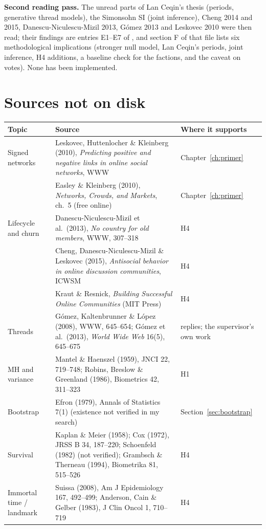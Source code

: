 \textbf{Second reading pass.} The unread parts of Lan Ceqin's thesis (periods, generative thread models), the Simonsohn SI (joint inference), Cheng 2014 and 2015, Danescu-Niculescu-Mizil 2013, G\'omez 2013 and Leskovec 2010 were then read; their findings are entries E1--E7 of , and section F of that file lists six methodological implications (stronger null model, Lan Ceqin's periods, joint inference, H4 additions, a baseline check for the factions, and the caveat on votes). None has been implemented.

\section{Sources not on disk}
\begin{tabularx}{\textwidth}{@{}l Y l@{}}
\toprule
Topic & Source & Where it supports \\
\midrule
Signed networks & Leskovec, Huttenlocher \& Kleinberg (2010), \emph{Predicting positive and negative links in online social networks}, WWW & Chapter~\ref{ch:primer} \\
 & Easley \& Kleinberg (2010), \emph{Networks, Crowds, and Markets}, ch.~5 (free online) & Chapter~\ref{ch:primer} \\
Lifecycle and churn & Danescu-Niculescu-Mizil et al.\ (2013), \emph{No country for old members}, WWW, 307--318 & H4 \\
 & Cheng, Danescu-Niculescu-Mizil \& Leskovec (2015), \emph{Antisocial behavior in online discussion communities}, ICWSM & H4 \\
 & Kraut \& Resnick, \emph{Building Successful Online Communities} (MIT Press) & H4 \\
Threads & G\'omez, Kaltenbrunner \& L\'opez (2008), WWW, 645--654; G\'omez et al.\ (2013), \emph{World Wide Web} 16(5), 645--675 & replies; the supervisor's own work \\
MH and variance & Mantel \& Haenszel (1959), JNCI 22, 719--748; Robins, Breslow \& Greenland (1986), Biometrics 42, 311--323 & H1 \\
Bootstrap & Efron (1979), Annals of Statistics 7(1) (existence not verified in my search) & Section~\ref{sec:bootstrap} \\
Survival & Kaplan \& Meier (1958); Cox (1972), JRSS B 34, 187--220; Schoenfeld (1982) (not verified); Grambsch \& Therneau (1994), Biometrika 81, 515--526 & H4 \\
Immortal time / landmark & Suissa (2008), Am J Epidemiology 167, 492--499; Anderson, Cain \& Gelber (1983), J Clin Oncol 1, 710--719 & H4 \\

\end{tabularx}

